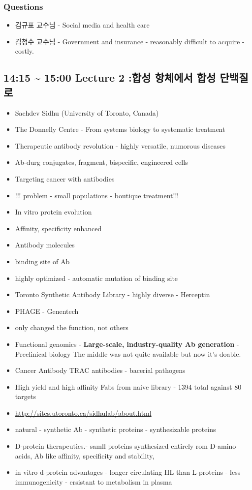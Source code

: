 \documentclass[]{book}
\providecommand{\tightlist}{%
  \setlength{\itemsep}{0pt}\setlength{\parskip}{0pt}}
\begin{document}
\subsubsection{Questions}\label{questions}

\begin{itemize}
\tightlist
\item
  김규표 교수님 - Social media and health care
\item
  김청수 교수님 - Government and insurance - reasonably difficult to
  acquire - costly.
\end{itemize}

\subsection{14:15 \textasciitilde{} 15:00 Lecture 2 :합성 항체에서 합성
단백질로}\label{lecture-2----}

\begin{itemize}
\tightlist
\item
  Sachdev Sidhu (University of Toronto, Canada)
\item
  The Donnelly Centre - From systems biology to systematic treatment
\item
  Therapeutic antibody revolution - highly versatile, numorous diseases
\item
  Ab-durg conjugates, fragment, bispecific, engineered cells
\item
  Targeting cancer with antibodies
\item
  !!! problem - small populations - boutique treatment!!!
\item
  In vitro protein evolution
\item
  Affinity, specificity enhanced
\item
  Antibody molecules
\item
  binding site of Ab
\item
  highly optimized - automatic mutation of binding site
\item
  Toronto Synthetic Antibody Library - highly diverse - Herceptin
\item
  PHAGE - Genentech
\item
  only changed the function, not others
\item
  Functional genomics - \textbf{Large-scale, industry-quality Ab
  generation} - Preclinical biology \textbar{} The middle was not quite
  available but now it's doable.
\item
  Cancer Antibody TRAC antibodies - bacerial pathogens
\item
  High yield and high affinity Fabs from naive library - 1394 total
  against 80 targets
\item
  \url{http://sites.utoronto.ca/sidhulab/about.html}
\item
  natural - synthetic Ab - synthetic proteins - synthesizable proteins
\item
  D-protein therapeutics.- samll proteins synthesized entirely rom
  D-amino acids, Ab like affinity, specificity and stability,
\item
  in vitro d-protein advantages - longer circulating HL than L-proteins
  - less immunogenicity - ersistant to metabolism in plasma
\end{itemize}
\end{document}
